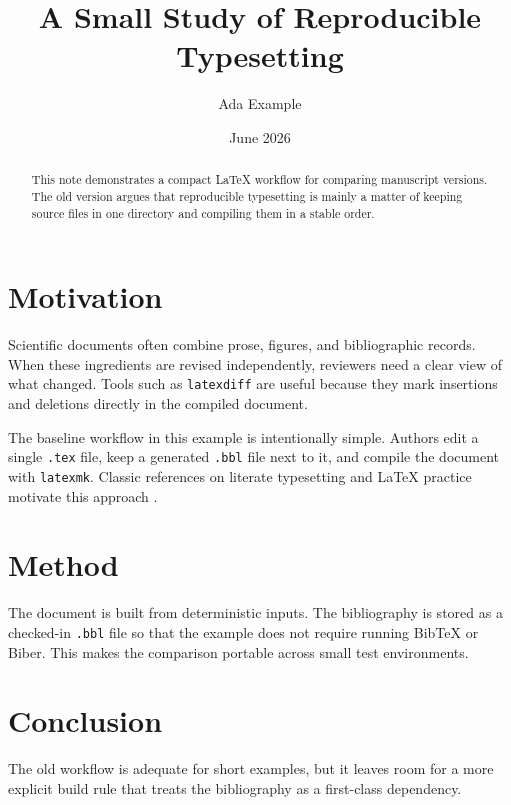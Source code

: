 \documentclass{article}
\title{A Small Study of Reproducible Typesetting}
\author{Ada Example}
\date{June 2026}
\begin{document}
\maketitle

\begin{abstract}
This note demonstrates a compact LaTeX workflow for comparing manuscript
versions.  The old version argues that reproducible typesetting is mainly a
matter of keeping source files in one directory and compiling them in a stable
order.
\end{abstract}

\section{Motivation}

Scientific documents often combine prose, figures, and bibliographic records.
When these ingredients are revised independently, reviewers need a clear view
of what changed.  Tools such as \texttt{latexdiff} are useful because they mark
insertions and deletions directly in the compiled document.

The baseline workflow in this example is intentionally simple.  Authors edit a
single \texttt{.tex} file, keep a generated \texttt{.bbl} file next to it, and
compile the document with \texttt{latexmk}.  Classic references on literate
typesetting and LaTeX practice motivate this approach \cite{knuth1984,lamport1994}.

\section{Method}

The document is built from deterministic inputs.  The bibliography is stored as
a checked-in \texttt{.bbl} file so that the example does not require running
BibTeX or Biber.  This makes the comparison portable across small test
environments.

\section{Conclusion}

The old workflow is adequate for short examples, but it leaves room for a more
explicit build rule that treats the bibliography as a first-class dependency.


\end{document}
